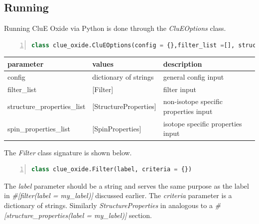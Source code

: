 \documentclass{book}
\begin{document}
\subsection{Running}
Running CluE Oxide via Python is done through the \textit{CluEOptions} class.
\begin{lstlisting}[frame=single,numbers=left,language=python]
class clue_oxide.CluEOptions(config = {},filter_list =[], structure_properties_list = [], spin_properties_list = [])
\end{lstlisting}

\begin{center}
\begin{tabular}{| m{12em} | m{3.5cm}| m{7cm} |}
 \hline 
 \textbf{parameter} & \textbf{values} & \textbf{description} \\ 
 \hline
 config & dictionary of strings & general config input\\
 \hline
 filter\_list & [Filter] & filter input\\ 
 \hline
 structure\_properties\_list & [StructureProperties] & 
 non-isotope specific properties input\\ 
 \hline
 spin\_properties\_list & [SpinProperties] & 
 isotope specific properties input\\ 
 \hline 
\end{tabular}
\end{center}
The \textit{Filter} class signature is shown below.
\begin{lstlisting}[frame=single,numbers=left,language=python]
class clue_oxide.Filter(label, criteria = {})
\end{lstlisting}
The \textit{label} parameter should be a string and serves the same purpose as 
the label in \textit{\#[filter(label = my\_label)]} discussed earlier.
The \textit{criteria} parameter is a dictionary of strings.
Similarly \textit{StructureProperties} in analogous to a 
\textit{\#[structure\_properties(label = my\_label)]} section.
\end{document}
